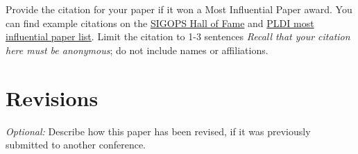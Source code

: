 \documentclass[pageno]{jpaper}
\begin{document}
Provide the citation for your paper if it won a Most Influential
Paper award. You can find example citations
on the \href{https://www.sigops.org/awards/hof/}{SIGOPS Hall of Fame}
and \href{https://www.sigplan.org/Awards/PLDI/}{PLDI most influential
  paper list}.  Limit the citation to 1-3 sentences
\emph{Recall that your citation here must be anonymous}; do not include names or affiliations.


\section{Revisions}
\label{sec:revisions}

 \emph{Optional:} Describe how this paper has been revised, if it was previously submitted to another conference.

 
\pagebreak


\end{document}
